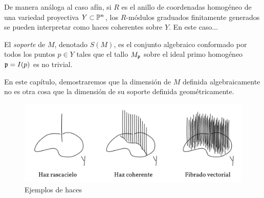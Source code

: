 De manera análoga al caso afín, si $R$ es el anillo de coordenadas homogéneo de una variedad proyectiva $Y \subset \P^n$, los $R$-módulos graduados finitamente generados se pueden interpretar como haces coherentes sobre $Y$. En este caso...

\begin{definition}
El \textit{soporte} de $M$, denotado $S(M)$, es el conjunto algebraico conformado por todos los puntos $p \in Y$ tales que el tallo $M_\p$ sobre el ideal primo homogéneo $\p = I(p)$ es no trivial.
\end{definition}

En este capítulo, demostraremos que la dimensión de $M$ definida algebraicamente no es otra cosa que la dimensión de su soporte definida geométricamente.

\begin{figure}[h]
    \centering
    \includegraphics[scale=0.3]{ch5/sheaf.png}
    \caption{Ejemplos de haces}
\end{figure}
